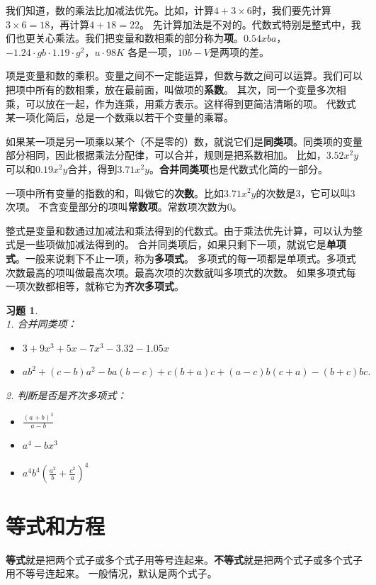 \documentclass[12pt,UTF8]{ctexbook}
\newtheorem{xt}{习题}[section]
\begin{document}
我们知道，数的乘法比加减法优先。比如，计算$4 + 3\times 6$时，我们要先计算$3\times 6 = 18$，再计算$4 + 18 = 22$。
先计算加法是不对的。代数式特别是整式中，我们也更关心乘法。我们把变量和数相乘的部分称为\textbf{项}。$0.54xba$，$-1.24\cdot gb\cdot 1.19 \cdot g^2$，$u\cdot 98K$
各是一项，$10b - V$是两项的差。

项是变量和数的乘积。变量之间不一定能运算，但数与数之间可以运算。我们可以把项中所有的数相乘，放在最前面，叫做项的\textbf{系数}。
其次，同一个变量多次相乘，可以放在一起，作为连乘，用乘方表示。这样得到更简洁清晰的项。
代数式某一项化简后，总是一个数乘以若干个变量的乘幂。

如果某一项是另一项乘以某个（不是零的）数，就说它们是\textbf{同类项}。同类项的变量部分相同，因此根据乘法分配律，可以合并，规则是把系数相加。
比如，$3.52x^2y$可以和$0.19x^2y$合并，得到$3.71x^2y$。\textbf{合并同类项}也是代数式化简的一部分。

一项中所有变量的指数的和，叫做它的\textbf{次数}。比如$3.71x^2y$的次数是$3$，它可以叫$3$次项。
不含变量部分的项叫\textbf{常数项}。常数项次数为$0$。

整式是变量和数通过加减法和乘法得到的代数式。由于乘法优先计算，可以认为整式是一些项做加减法得到的。
合并同类项后，如果只剩下一项，就说它是\textbf{单项式}。一般来说剩下不止一项，称为\textbf{多项式}。
多项式的每一项都是单项式。多项式次数最高的项叫做最高次项。最高次项的次数就叫多项式的次数。
如果多项式每一项次数都相等，就称它为\textbf{齐次多项式}。
\begin{xt}\label{xt:1-0-0}
    \mbox{} \\
    1. 合并同类项：\begin{itemize}
        \item $3 + 9x^3 + 5x - 7x^3 - 3.32 - 1.05x$
        \item $ab^2 + (c-b)a^2 - ba(b - c) + c(b + a)c + (a - c)b(c + a) - (b + c)bc.$
    \end{itemize}
    2. 判断是否是齐次多项式：\begin{itemize}
        \item $\frac{(a+b)^3}{a - b}$
        \item $a^4 - bx^3$
        \item $a^4b^4\left(\frac{a^2}{b} + \frac{c^2}{a}\right)^4$
    \end{itemize}
\end{xt}

\section{等式和方程}
\textbf{等式}就是把两个式子或多个式子用等号连起来。\textbf{不等式}就是把两个式子或多个式子用不等号连起来。
一般情况，默认是两个式子。
\end{document}

